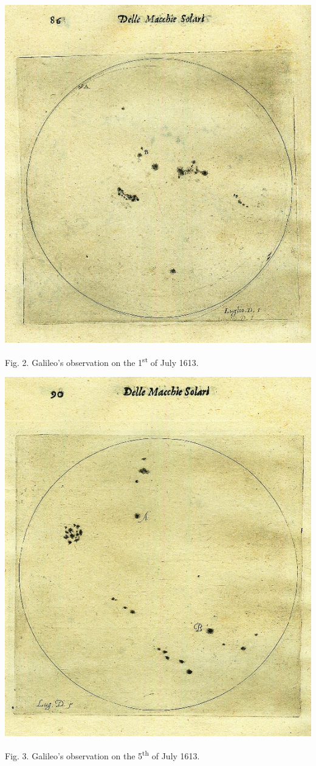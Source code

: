\documentclass[a4paper]{article}
\begin{document}
{\centering  \includegraphics{Sierotowiczorg-img002.jpg} \par}
{\centering
Fig. 2. Galileo’s observation on the 1\textsuperscript{st} of July 1613.
\par}

{\centering  \includegraphics{Sierotowiczorg-img003.jpg} \par}
{\centering
Fig. 3. Galileo’s observation on the 5\textsuperscript{th} of July 1613.
\par}
\end{document}
